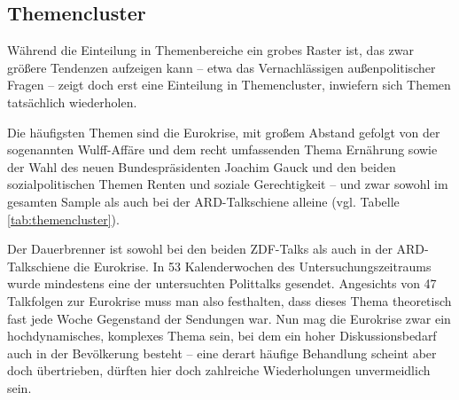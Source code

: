 \subsection{Themencluster}\label{chap:themencluster}

Während die Einteilung in Themenbereiche ein grobes Raster ist, das zwar größere Tendenzen aufzeigen kann – etwa das Vernachlässigen außenpolitischer Fragen – zeigt doch erst eine Einteilung in Themencluster, inwiefern sich Themen tatsächlich wiederholen.

Die häufigsten Themen sind die Eurokrise, mit großem Abstand gefolgt von der sogenannten Wulff-Affäre und dem recht umfassenden Thema Ernährung sowie der Wahl des neuen Bundespräsidenten Joachim Gauck und den beiden sozialpolitischen Themen Renten und soziale Gerechtigkeit – und zwar sowohl im gesamten Sample als auch bei der ARD-Talkschiene alleine (vgl. Tabelle \vref{tab:themencluster}).

\begin{table}[ht]
	\centering
	\caption{Häufige Themencluster}
	\label{tab:themencluster}
\end{table}

Der Dauerbrenner ist sowohl bei den beiden ZDF-Talks als auch in der ARD-Talkschiene die Eurokrise. In 53 Kalenderwochen des Untersuchungszeitraums wurde mindestens eine der untersuchten Polittalks gesendet. Angesichts von 47 Talkfolgen zur Eurokrise muss man also festhalten, dass dieses Thema theoretisch fast jede Woche Gegenstand der Sendungen war. Nun mag die Eurokrise zwar ein hochdynamisches, komplexes Thema sein, bei dem ein hoher Diskussionsbedarf auch in der Bevölkerung besteht – eine derart häufige Behandlung scheint aber doch übertrieben, dürften hier doch zahlreiche Wiederholungen unvermeidlich sein.

